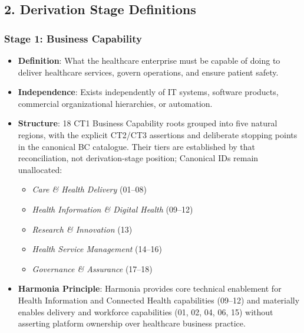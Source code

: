 \par\smallskip
{}\label{rad:tier-model:93}
\subsection*{2. Derivation Stage Definitions}
\label{rad:tier-model:95}
\subsubsection*{Stage 1: Business Capability}
\label{rad:tier-model:96}

\begin{itemize}

\item 
\textbf{Definition}: What the healthcare enterprise must be capable of doing to deliver healthcare services, govern operations, and ensure patient safety.



\item 
\textbf{Independence}: Exists independently of IT systems, software products, commercial organizational hierarchies, or automation.



\item 
\textbf{Structure}: 18 CT1 Business Capability roots grouped into five natural regions, with the explicit CT2/\allowbreak{}CT3 assertions and deliberate stopping points in the canonical BC catalogue. Their tiers are established by that reconciliation, not derivation-stage position; Canonical IDs remain unallocated:


\begin{itemize}

\item 
\emph{Care \& Health Delivery} (01–08)



\item 
\emph{Health Information \& Digital Health} (09–12)



\item 
\emph{Research \& Innovation} (13)



\item 
\emph{Health Service Management} (14–16)



\item 
\emph{Governance \& Assurance} (17–18)



\end{itemize}


\item 
\textbf{Harmonia Principle}: Harmonia provides core technical enablement for Health Information and Connected Health capabilities (09–12) and materially enables delivery and workforce capabilities (01, 02, 04, 06, 15) without asserting platform ownership over healthcare business practice.



\end{itemize}
\label{rad:tier-model:106}

